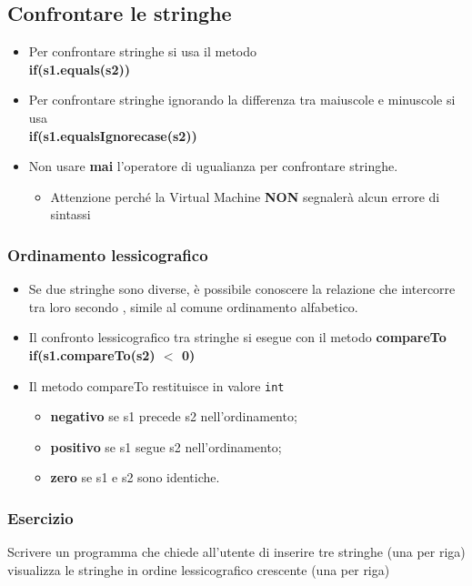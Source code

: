 \subsection*{Confrontare le stringhe}
\begin{frame}
\begin{block}{}
\begin{itemize}
\item Per confrontare stringhe si usa il metodo \textbf{}\\
\hspace{0.7cm}\textbf{if(s1.\textbf{\alert{equals(s2)}})}
\item Per confrontare stringhe ignorando la differenza tra maiuscole e minuscole si usa \textbf{}\\
\hspace{0.7cm}\textbf{if(s1.\textbf{\alert{equalsIgnorecase(s2)}})}
\item Non usare \textbf{\alert{mai}} l'operatore di ugualianza per confrontare stringhe. \textbf{}
\begin{itemize}
\item Attenzione perché la Virtual Machine \textbf{\alert{NON}} segnalerà alcun errore di sintassi
\end{itemize}
\end{itemize}
\end{block}
\end{frame}

\begin{frame}
\frametitle{Ordinamento lessicografico}
\begin{block}{}
\begin{itemize}
\item Se due stringhe sono diverse, è possibile conoscere la relazione che intercorre tra loro secondo \textbf{}, simile al comune ordinamento alfabetico.
\item Il confronto lessicografico tra stringhe si esegue con il metodo \textbf{compareTo}\\
\hspace{0.7cm}\textbf{if(s1.\alert{compareTo}(s2) $<$ 0)}
\item Il metodo compareTo restituisce in valore \texttt{int}
\begin{itemize}
\item \textbf{negativo} se s1 precede s2 nell'ordinamento;
\item \textbf{positivo} se s1 segue s2 nell'ordinamento;
\item \textbf{zero} se s1 e s2 sono identiche.
\end{itemize}
\end{itemize}
\end{block}
\end{frame}

\begin{frame}
\frametitle{Esercizio}
\begin{block}{}
Scrivere un programma che chiede all'utente di inserire tre stringhe (una per riga) visualizza le stringhe in ordine lessicografico 
crescente (una per riga)
\end{block}
\end{frame}
